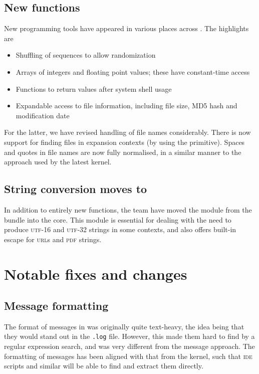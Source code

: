 \documentclass{ltnews}
\begin{document}
\subsection{New functions}

New programming tools have appeared in various places across .
The highlights are
\begin{itemize}
  \item Shuffling of sequences to allow randomization
  \item Arrays of integers and floating point values; these have constant-time
    access
  \item Functions to return values after system shell usage
  \item Expandable access to file information, including file size, MD5
    hash and modification date
\end{itemize}

For the latter, we have revised handling of file names considerably. There is
now support for finding files in expansion contexts (by using the
 primitive). Spaces and quotes in file names are now fully
normalised, in a similar manner to the approach used by the latest \LaTeXe{}
kernel.

\subsection{String conversion moves to }

In addition to entirely new functions, the team have moved the
 module from the  bundle into the
 core. This module is essential for dealing with the need to produce
\textsc{utf}-16 and \textsc{utf}-32 strings in some contexts, and also offers
built-in escape for \textsc{url}s and \textsc{pdf} strings.

\section{Notable fixes and changes}

\subsection{Message formatting}

The format of messages in  was originally quite text-heavy, the idea
being that they would stand out in the \texttt{.log} file. However, this made
them hard to find by a regular expression search, and was very different from
the \LaTeXe{} message approach. The formatting of  messages has been
aligned with that from the \LaTeXe{} kernel, such that \textsc{ide} scripts and
similar will be able to find and extract them directly.
\end{document}
